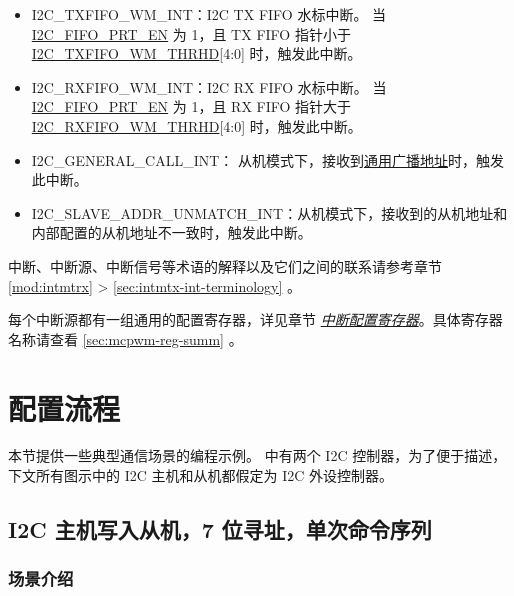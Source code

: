 \documentclass[main\_\_CN.tex]{subfiles}
\begin{document}
\begin{itemize}
\item \label{int:i2c-txfifo-wm}I2C\_TXFIFO\_WM\_INT：I2C TX FIFO 水标中断。 当\hyperref[fielddesc:I2CFIFOPRTEN]{I2C\_FIFO\_PRT\_EN} 为 1，且 TX FIFO 指针小于\\\hyperref[fielddesc:I2CTXFIFOWMTHRHD]{I2C\_TXFIFO\_WM\_THRHD}[4:0] 时，触发此中断。
\item \label{int:i2c-rxfifo-wm}I2C\_RXFIFO\_WM\_INT：I2C RX FIFO 水标中断。 当\hyperref[fielddesc:I2CFIFOPRTEN]{I2C\_FIFO\_PRT\_EN} 为 1，且 RX FIFO 指针大于\\\hyperref[fielddesc:I2CRXFIFOWMTHRHD]{I2C\_RXFIFO\_WM\_THRHD}[4:0] 时，触发此中断。
\item \label{int:i2c-general-call}I2C\_GENERAL\_CALL\_INT： 从机模式下，接收到\href{https://www.csd.uoc.gr/~hy428/reading/i2c_spec.pdf#page=16}{通用广播地址}时，触发此中断。
\item \label{int:i2c-slave-addr-unmatch}I2C\_SLAVE\_ADDR\_UNMATCH\_INT：从机模式下，接收到的从机地址和内部配置的从机地址不一致时，触发此中断。
\end{itemize}

\begin{tiplisting}
中断、中断源、中断信号等术语的解释以及它们之间的联系请参考章节 \ref{mod:intmtrx} \textit{} > \ref{sec:intmtx-int-terminology} \textit{}。
\end{tiplisting}

每个中断源都有一组通用的配置寄存器，详见章节 \hyperref[interrupt-config-registers]{\textit{中断配置寄存器}}。具体寄存器名称请查看 \ref{sec:mcpwm-reg-summ} \textit{}。

\section{配置流程}
\label{subsec:i2c-prom-guide}

本节提供一些典型通信场景的编程示例。\chipname{} 中有两个 I2C 控制器，为了便于描述，下文所有图示中的 I2C 主机和从机都假定为 \chipname{} I2C 外设控制器。

\subsection{I2C 主机写入从机，7 位寻址，单次命令序列}
\label{subsec:i2c-mws7}

\subsubsection{场景介绍}
\end{document}
